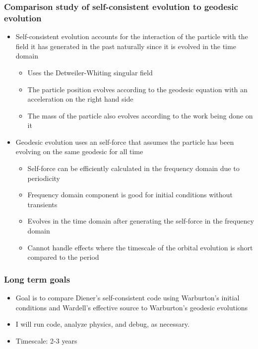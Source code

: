 \documentclass{beamer}
\begin{document}
      
\begin{frame}
  \frametitle{Comparison study of self-consistent evolution to geodesic evolution}
  \begin{itemize}
  \item Self-consistent evolution accounts for the interaction of the particle with the field it has generated in the past naturally since it is evolved in the time domain
    \begin{itemize}
    \item Uses the Detweiler-Whiting singular field 
    \item The particle position evolves according to the geodesic equation with an acceleration on the right hand side
    \item The mass of the particle also evolves according to the work being done on it
    \end{itemize}
  \item Geodesic evolution uses an self-force that assumes the particle has been evolving on the same geodesic for all time
    \begin{itemize}
    \item Self-force can be efficiently calculated in the frequency domain due to periodicity
    \item Frequency domain component is good for initial conditions without transients
    \item Evolves in the time domain after generating the self-force in the frequency domain
    \item Cannot handle effects where the timescale of the orbital evolution is short compared to the period
    \end{itemize}
  \end{itemize}
\end{frame}

\begin{frame}
  \frametitle{Long term goals}
  \begin{itemize}
  \item Goal is to compare Diener's self-consistent code using Warburton's initial conditions and Wardell's effective source to Warburton's geodesic evolutions
  \item I will run code, analyze physics, and debug, as necessary.
  \item Timescale: 2-3 years
  \end{itemize}
\end{frame}
\end{document}
